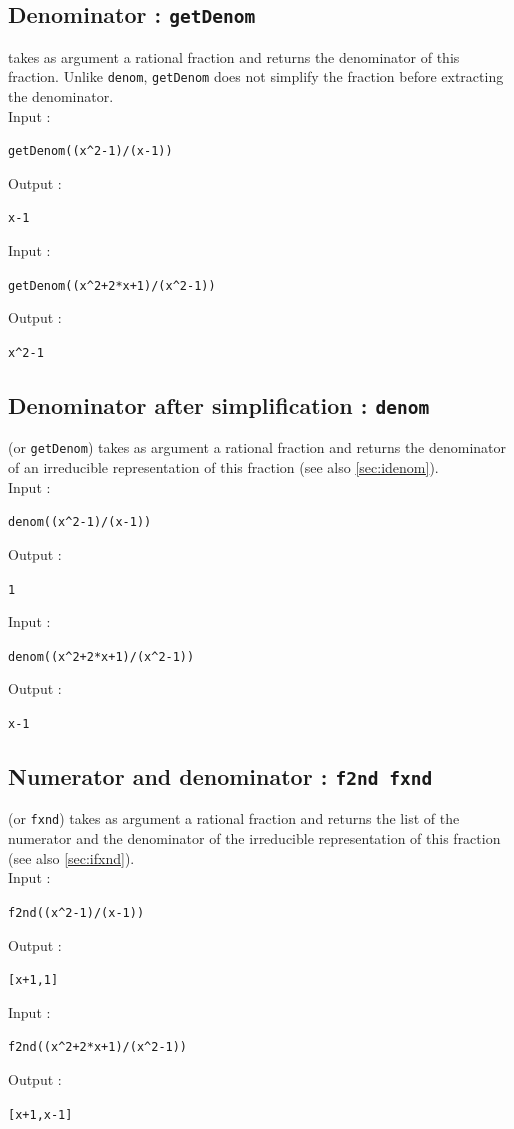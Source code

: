 \documentclass[a4paper,11pt]{book}
\begin{document}
\subsection{Denominator : {\tt getDenom}}\label{sec:getdenom}
 takes as argument a rational fraction and  returns the 
denominator of this fraction. Unlike {\tt denom},
{\tt getDenom} does not simplify the fraction before extracting
the denominator.\\
Input :
\begin{center}{\tt getDenom((x\verb|^|2-1)/(x-1)) }\end{center}
Output :
\begin{center}{\tt x-1}\end{center}
Input :
\begin{center}{\tt getDenom((x\verb|^|2+2*x+1)/(x\verb|^|2-1)) }\end{center}
Output :
\begin{center}{\tt x\verb|^|2-1}\end{center}

\subsection{Denominator after simplification : {\tt denom}}\label{sec:denom}
 (or {\tt getDenom}) takes as argument a rational fraction 
and  returns the denominator of an irreducible representation
of this fraction (see also \ref{sec:idenom}).\\
Input :
\begin{center}{\tt denom((x\verb|^|2-1)/(x-1)) }\end{center}
Output :
\begin{center}{\tt 1}\end{center}
Input :
\begin{center}{\tt denom((x\verb|^|2+2*x+1)/(x\verb|^|2-1)) }\end{center}
Output :
\begin{center}{\tt x-1}\end{center}

\subsection{Numerator and  denominator : {\tt f2nd fxnd}}\label{sec:fxnd}
 (or {\tt fxnd}) takes as argument a rational fraction and 
returns the list of the numerator and the denominator of the irreducible
representation of this fraction (see also \ref{sec:ifxnd}).\\
Input :
\begin{center}{\tt f2nd((x\verb|^|2-1)/(x-1)) }\end{center}
Output :
\begin{center}{\tt [x+1,1]}\end{center}
Input :
\begin{center}{\tt f2nd((x\verb|^|2+2*x+1)/(x\verb|^|2-1)) }\end{center}
Output :
\begin{center}{\tt [x+1,x-1]}\end{center}
\end{document}

